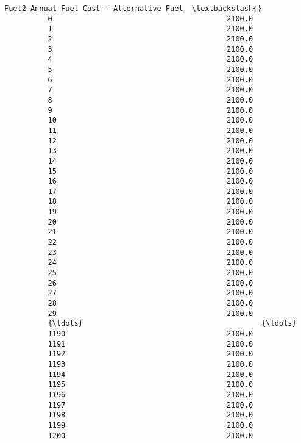 \documentclass[11pt]{article}
\begin{document}
\begin{Verbatim}[commandchars=\\\{\}]
                Fuel2 Annual Fuel Cost - Alternative Fuel  \textbackslash{}
          0                                        2100.0   
          1                                        2100.0   
          2                                        2100.0   
          3                                        2100.0   
          4                                        2100.0   
          5                                        2100.0   
          6                                        2100.0   
          7                                        2100.0   
          8                                        2100.0   
          9                                        2100.0   
          10                                       2100.0   
          11                                       2100.0   
          12                                       2100.0   
          13                                       2100.0   
          14                                       2100.0   
          15                                       2100.0   
          16                                       2100.0   
          17                                       2100.0   
          18                                       2100.0   
          19                                       2100.0   
          20                                       2100.0   
          21                                       2100.0   
          22                                       2100.0   
          23                                       2100.0   
          24                                       2100.0   
          25                                       2100.0   
          26                                       2100.0   
          27                                       2100.0   
          28                                       2100.0   
          29                                       2100.0   
          {\ldots}                                         {\ldots}   
          1190                                     2100.0   
          1191                                     2100.0   
          1192                                     2100.0   
          1193                                     2100.0   
          1194                                     2100.0   
          1195                                     2100.0   
          1196                                     2100.0   
          1197                                     2100.0   
          1198                                     2100.0   
          1199                                     2100.0   
          1200                                     2100.0   

\end{Verbatim}
\end{document}
